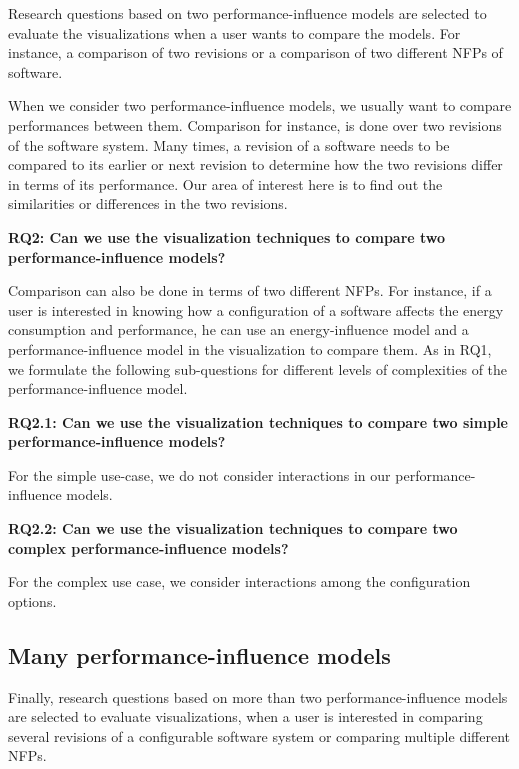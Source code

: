 Research questions based on two performance-influence models are selected to evaluate the visualizations when a user wants to compare the models. For instance, a comparison of two revisions or a comparison of two different NFPs of software.

When we consider two performance-influence models, we usually want to compare performances between them. Comparison for instance, is done over two revisions of the software system. Many times, a revision of a software needs to be compared to its earlier or next revision to determine how the two revisions differ in terms of its performance. Our area of interest here is to find out the similarities or differences in the two revisions.

\begin{mdframed}
\textbf{RQ2: Can we use the visualization techniques to compare two performance-influence models?}
\end{mdframed}

Comparison can also be done in terms of two different NFPs. For instance, if a user is interested in knowing how a configuration of a software affects the energy consumption and performance, he can use an energy-influence model and a performance-influence model in the visualization to compare them. As in RQ1, we formulate the following sub-questions for different levels of complexities of the performance-influence model.

\begin{mdframed}
\textbf{RQ2.1: Can we use the visualization techniques to compare two simple performance-influence models?}
\end{mdframed}

For the simple use-case, we do not consider interactions in our performance-influence models.

\begin{mdframed}
\textbf{RQ2.2: Can we use the visualization techniques to compare two complex performance-influence models?}
\end{mdframed}

For the complex use case, we consider interactions among the configuration options.

\subsection{Many performance-influence models}

Finally, research questions based on more than two performance-influence models are selected to evaluate visualizations, when a user is interested in comparing several revisions of a configurable software system or comparing multiple different NFPs.

